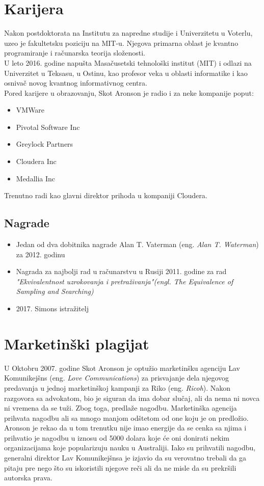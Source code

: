\documentclass[a4paper]{article}
\begin{document}
{\section{Karijera}
Nakon postdoktorata na Institutu za napredne studije i Univerzitetu u Voterlu, 
uzeo je fakultetsku poziciju na MIT-u. Njegova primarna oblast je kvantno programiranje i računarska teorija složenosti. 
\\[1\baselineskip]
U leto 2016. godine napušta Masačusetski tehnološki institut (MIT) i odlazi na Univerzitet u Teksasu, 
u Ostinu, kao profesor veka u oblasti informatike i kao osnivač novog kvantnog informativnog centra.
\\[1\baselineskip]
Pored karijere u obrazovanju, Skot Aronson je radio i za neke kompanije poput:
\begin{itemize}
\item VMWare
\item Pivotal Software Inc
\item Greylock Partners
\item Cloudera Inc
\item Medallia Inc
\end{itemize}
Trenutno radi kao glavni direktor prihoda u kompaniji Cloudera. \cite{company}


\subsection{Nagrade}
\begin{itemize}
\item Jedan od dva dobitnika nagrade Alan T. Vaterman (eng. \textit{Alan T. Waterman}) za 2012. godinu \cite{nagrada1}
\item Nagrada za najbolji rad u računarstvu u Rusiji 2011. godine za rad \textit{"Ekvivalentnost uzrokovanja i pretraživanja"(engl. The Equivalence of Sampling and Searching)} 
\item 2017. Simons istražitelj \cite{nagrada2}
\end{itemize}


\section{Marketinški plagijat}
U Oktobru 2007. godine Skot Aronson je optužio marketinšku agenciju Lav Komunikejšns (eng. \textit{Love Communications}) 
za prisvajanje dela njegovog predavanja u jednoj marketinškoj kampanji za Riko (eng. \textit{Ricoh}). Nakon razgovora sa advokatom, 
bio je siguran da ima dobar slučaj, ali da nema ni novca ni vremena da se tuži. Zbog toga, predlaže nagodbu. 
Marketinška agencija prihvata nagodbu ali sa mnogo manjom odštetom od one koju je on predložio. 
Aronson je rekao da u tom trenutku nije imao energije da se cenka sa njima i prihvatio je 
nagodbu u iznosu od 5000 dolara koje će oni donirati nekim organizacijama koje popularizuju nauku u Australiji. 
Iako su prihvatili nagodbu, generalni direktor Lav Komunikejšnsa je izjavio da su verovatno trebali da ga pitaju 
pre nego što su iskoristili njegove reči ali da ne misle da su prekršili autorska prava. \cite{ad}

}
\end{document}
